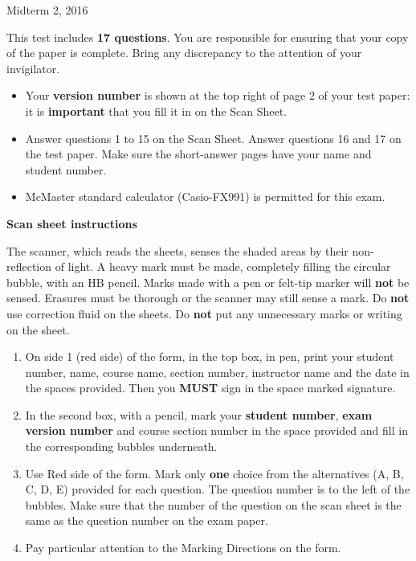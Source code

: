 \documentclass[12pt]{article}
\begin{document}
{ \par}
{\centering Midterm 2, 2016 \par}

\parindent0pt

\vfill

This test includes {\bf 17 questions}. You are responsible for ensuring that your copy of the paper is complete. Bring any discrepancy to the attention of your invigilator. 

\vfill

\begin{itemize}
\item Your \textbf{version number} is shown at the top right of page 2 of your test paper: it is \textbf{important} that you fill it in on the Scan Sheet.
\item Answer questions 1 to 15 on the Scan Sheet. Answer questions 16 and 17 on the test paper. Make sure the short-answer pages have your name and student number.
\item McMaster standard calculator (Casio-FX991) is permitted for this exam.
\end{itemize}

\vfill

\textbf{Scan sheet instructions}

\small{
The scanner, which reads the sheets, senses the shaded areas by their non-reflection of light. A heavy mark must be made, completely filling the circular bubble, with an HB pencil. Marks made with a pen or felt-tip marker will \textbf{not} be sensed. Erasures must be thorough or the scanner may still sense a mark. Do \textbf{not} use correction fluid on the sheets. Do \textbf{not} put any unnecessary marks or writing on the sheet.

\begin{enumerate}
\item On side 1 (red side) of the form, in the top box, in pen, print your student number, name, course name, section number, instructor name and the date in the spaces provided. Then you {\bf MUST} sign in the space marked signature.

\item In the second box, with a pencil, mark your {\bf student number}, {\bf exam version number} and course section number in the space provided and fill in the corresponding bubbles underneath.

\item Use Red side of the form. Mark only {\bf one} choice from the alternatives (A, B, C, D, E) provided for each question. The question number is to the left of the bubbles. Make sure that the number of the question on the scan sheet is the same as the question number on the exam paper.
\item  Pay particular attention to the Marking Directions on the form.
\end{enumerate}
}

\vfill
{ \par}
\end{document}
